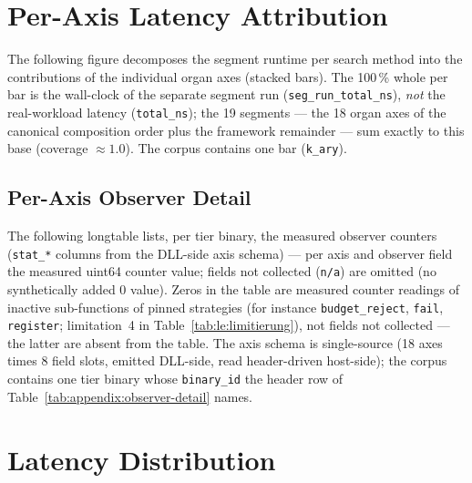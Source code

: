 \section{Per-Axis Latency Attribution}\label{sec:measurements:seg-attribution}

The following figure decomposes the segment runtime per search method into the contributions of the
individual organ axes (stacked bars). The 100\,\% whole per bar is the wall-clock of the separate
segment run (\texttt{seg\_run\_total\_ns}), \emph{not} the real-workload latency
(\texttt{total\_ns}); the 19 segments --- the 18 organ axes of the canonical composition order plus
the framework remainder --- sum exactly to this base (coverage $\approx 1.0$). The corpus contains
one bar (\texttt{k\_ary}).


\subsection{Per-Axis Observer Detail}\label{sec:measurements:observer-detail}

The following longtable lists, per tier binary, the measured observer counters (\texttt{stat\_*}
columns from the DLL-side axis schema) --- per axis and observer field the measured uint64 counter
value; fields not collected (\texttt{n/a}) are omitted (no synthetically added 0 value). Zeros in
the table are measured counter readings of inactive sub-functions of pinned strategies (for
instance \texttt{budget\_reject}, \texttt{fail}, \texttt{register}; limitation~4 in
Table~\ref{tab:le:limitierung}), not fields not collected --- the latter are absent from the
table. The axis schema is single-source (18 axes times 8 field slots, emitted DLL-side, read
header-driven host-side); the corpus contains one tier binary whose \texttt{binary\_id} the header
row of Table~\ref{tab:appendix:observer-detail} names.


\section{Latency Distribution}\label{sec:measurements:latency-distribution}

